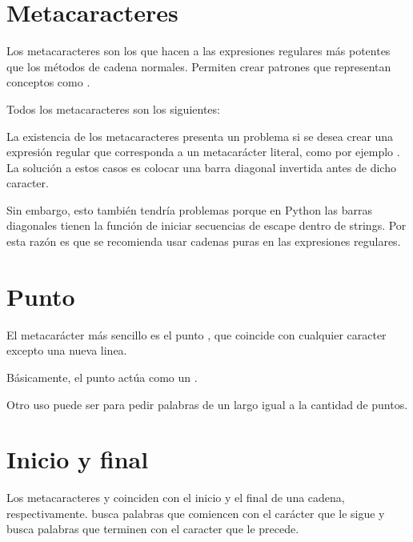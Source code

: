 \section{Metacaracteres}

Los metacaracteres son los que hacen a las expresiones regulares más potentes que los métodos de cadena normales.
Permiten crear patrones que representan conceptos como .

Todos los metacaracteres son los siguientes:


La existencia de los metacaracteres presenta un problema si se desea crear una expresión regular que corresponda a un metacarácter literal, como por ejemplo .
La solución a estos casos es colocar una barra diagonal invertida \ttt{\textbackslash} antes de dicho caracter.

Sin embargo, esto también tendría problemas porque en Python las barras diagonales \ttt{\textbackslash} tienen la función de iniciar secuencias de escape dentro de strings.
Por esta razón es que se recomienda usar cadenas puras en las expresiones regulares.


\section{Punto}

El metacarácter más sencillo es el punto , que coincide con cualquier caracter excepto una nueva linea.


Básicamente, el punto  actúa como un .

Otro uso puede ser para pedir palabras de un largo igual a la cantidad de puntos.


\section{Inicio y final}

Los metacaracteres \ttt{\^} y \ttt{\$} coinciden con el inicio y el final de una cadena, respectivamente.
\ttt{\^} busca palabras que comiencen con el carácter que le sigue y \ttt{\$} busca palabras que terminen con el caracter que le precede.

